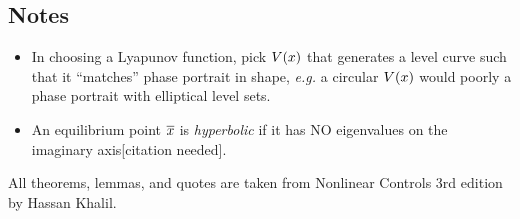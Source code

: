 \documentclass[twocolumn]{article}    %
\begin{document}
\subsection*{Notes}
\begin{itemize}
    \item In choosing a Lyapunov function, pick \(V(x)\) that generates a level curve such that it ``matches'' phase portrait in shape, \textit{e.g.} a circular \(V(x)\) would poorly  a phase portrait with elliptical level sets.

    \item An equilibrium point \(\overline{x}\) is \emph{hyperbolic} if it has NO eigenvalues on the imaginary axis[citation needed].
\end{itemize}


\begin{center}
    All theorems, lemmas, and quotes are taken from Nonlinear Controls 3rd edition by Hassan Khalil.
\end{center}
\end{document}
